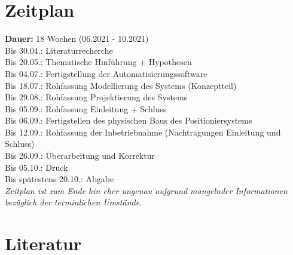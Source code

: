 \documentclass[12pt, a4paper, twoside]{article} %
\begin{document}
\section{Zeitplan}
\textbf{Dauer:} 18 Wochen (06.2021 - 10.2021)\\
Bis 30.04.: Literaturrecherche\\
Bis 20.05.: Thematische Hinführung + Hypothesen\\
Bis 04.07.: Fertigstellung der Automatisierungssoftware\\
Bis 18.07.: Rohfassung Modellierung des Systems (Konzeptteil)\\
Bis 29.08.: Rohfassung Projektierung des Systems\\
Bis 05.09.: Rohfassung Einleitung + Schluss\\
Bis 06.09.: Fertigstellen des physischen Baus des Positioniersystems\\
Bis 12.09.: Rohfassung der Inbetriebnahme (Nachtragungen Einleitung und Schluss)\\
Bis 26.09.: Überarbeitung und Korrektur\\
Bis 05.10.: Druck \\
Bis spätestens 20.10.: Abgabe\\
\textit{Zeitplan ist zum Ende hin eher ungenau aufgrund mangelnder Informationen bezüglich der terminlichen Umstände.}

\newpage
\section*{Literatur}

\nocite{Laplante2014}
\nocite{Bindel2017}

\printbibliography[
	heading=subbibintoc,
	type=book,
	title={Bücher}
]
	


\end{document}
